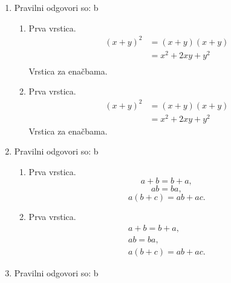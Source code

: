 \documentclass[11pt]{article}
\begin{document}
\begin{enumerate}
    \item Pravilni odgovori so: b %
    \begin{enumerate}
        \item Prva vrstica.
\begin{align*}
  (x + y)^2 &= (x + y)(x + y) \\
  &= x^2 + 2 x y + y^2 \\
\end{align*}
        Vrstica za enačbama.
        \item Prva vrstica.
\begin{align*}
  (x + y)^2 &= (x + y)(x + y) \\
  &= x^2 + 2 x y + y^2
\end{align*}
        Vrstica za enačbama.
    \end{enumerate}

    \item Pravilni odgovori so: b %
    \begin{enumerate}
        \item Prva vrstica.
\[ a + b = b + a, \]
\[ a b = b a, \]
\[ a (b + c) = a b + a c. \]
        \item Prva vrstica.
\begin{gather*}
  a + b = b + a, \\
  a b = b a, \\
  a (b + c) = a b + a c.
\end{gather*}
    \end{enumerate}

    \item Pravilni odgovori so: b %

\end{enumerate}
\end{document}
